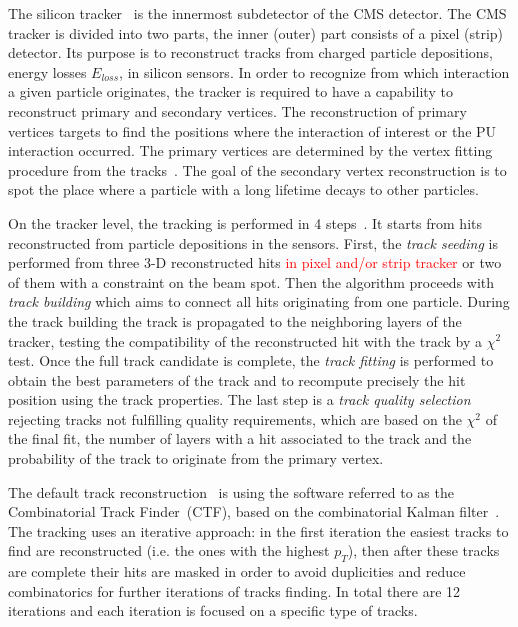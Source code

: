 The silicon tracker~\cite{CMS:1997tlf, CMS:2000eqx} is the innermost subdetector of the CMS detector. The CMS tracker is divided into two parts, the inner (outer) part consists of a pixel (strip) detector.  Its purpose is to reconstruct tracks from charged particle depositions, energy losses $E_{loss}$, in silicon sensors. In order to recognize from which interaction a given particle originates, the tracker is required to have a capability to reconstruct primary and secondary vertices. The reconstruction of primary vertices targets to find the positions where the interaction of interest or the PU interaction occurred. The primary vertices are determined by the vertex fitting procedure from the tracks~\cite{Ball:2007zza}. The goal of the secondary vertex reconstruction is to spot the place where a particle with a long lifetime decays to other particles. 

On the tracker level, the tracking is performed in 4 steps~\cite{website:slidesTracking, website:twikiTracking}. It starts from  hits reconstructed from particle depositions in the sensors. First, the \textit{track seeding} is performed from three 3-D reconstructed hits \textcolor{red}{ in pixel and/or strip tracker} or two of them with a constraint on the beam spot. Then the algorithm proceeds with \textit{track building} which aims to connect all hits originating from one particle. During the track building the track is propagated to the neighboring layers of the tracker, testing the compatibility of the reconstructed hit with the track by a $\chi^{2}$ test. Once the full track candidate is complete, the \textit{track fitting} is performed to obtain the best parameters of the track and to recompute precisely the hit position using the track properties. The last step is a \textit{track quality selection} rejecting tracks not fulfilling quality requirements, which are based on the $\chi^{2}$ of the final fit, the number of layers with a hit associated to the track and the probability of the track  to originate from the primary vertex.

The default track reconstruction~\cite{Chatrchyan:2014fea} is using the software referred to as the Combinatorial Track Finder~(CTF), based on the combinatorial Kalman filter~\cite{Fruhwirth:1987fm}. The tracking uses an iterative approach: in the first iteration the easiest tracks to find are reconstructed (i.e. the ones with the highest $p_{T}$), then after these tracks are complete their hits are masked in order to avoid duplicities and reduce combinatorics for further iterations of tracks finding. In total there are 12 iterations and each iteration is focused on a specific type of tracks.


